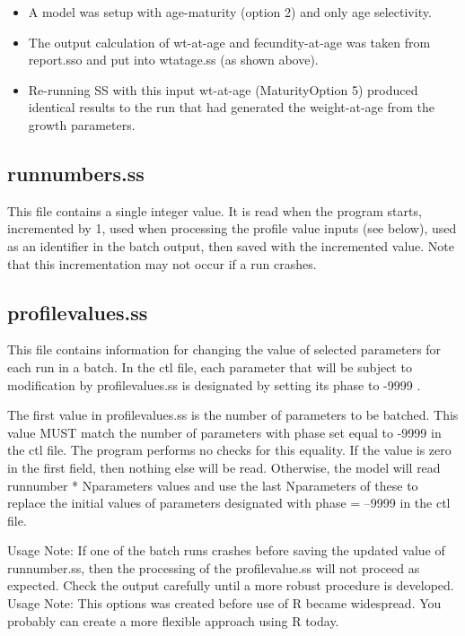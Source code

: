		\begin{itemize}
			\item A model was setup with age-maturity (option 2) and only age selectivity.
			\item The output calculation of wt-at-age and fecundity-at-age was taken from report.sso and put into wtatage.ss (as shown above).
			\item Re-running SS with this input wt-at-age (Maturity\textunderscore Option 5) produced identical results to the run that had generated the weight-at-age from the growth parameters.
		\end{itemize}


\subsection{runnumbers.ss}
This file contains a single integer value.  It is read when the program starts, incremented by 1, used when processing the profile value inputs (see below), used as an identifier in the batch output, then saved with the incremented value.  Note that this incrementation may not occur if a run crashes.

\subsection{profilevalues.ss}	
This file contains information for changing the value of selected parameters for each run in a batch.  In the ctl file, each parameter that will be subject to modification by profilevalues.ss is designated by setting its phase to -9999 .

The first value in profilevalues.ss is the number of parameters to be batched.  This value MUST match the number of parameters with phase set equal to -9999 in the ctl file.  The program performs no checks for this equality.  If the value is zero in the first field, then nothing else will be read.  Otherwise, the model will read runnumber * Nparameters values and use the last Nparameters of these to replace the initial values of parameters designated with phase = --9999 in the ctl file.

Usage Note:  If one of the batch runs crashes before saving the updated value of runnumber.ss, then the processing of the profilevalue.ss will not proceed as expected.  Check the output carefully until a more robust procedure is developed.
  Usage Note:  This options was created before use of R became widespread.  You probably can create a more flexible approach using R today.


